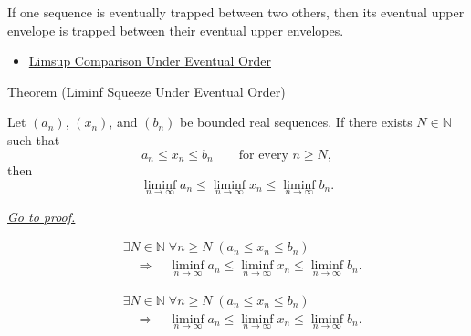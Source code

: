 \begin{remark*}[Interpretation]
If one sequence is eventually trapped between two others, then its eventual
upper envelope is trapped between their eventual upper envelopes.
\end{remark*}

\begin{dependencies}
\begin{itemize}
  \item \hyperref[thm:limsup-comparison-under-eventual-order]{Limsup Comparison Under Eventual Order}
\end{itemize}
\end{dependencies}


\begin{theorembox}{Theorem (Liminf Squeeze Under Eventual Order)}
\begin{theorem}
\label{thm:liminf-squeeze-under-eventual-order}
Let $(a_n)$, $(x_n)$, and $(b_n)$ be bounded real sequences. If there
exists $N\in\mathbb{N}$ such that
\[
  a_n\le x_n\le b_n
  \qquad\text{for every }n\ge N,
\]
then
\[
  \liminf_{n\to\infty}a_n
  \le
  \liminf_{n\to\infty}x_n
  \le
  \liminf_{n\to\infty}b_n.
\]

\smallskip
\noindent
\hyperref[prf:liminf-squeeze-under-eventual-order]{\textit{Go to proof.}}
\end{theorem}
\end{theorembox}

\begin{remark*}
\[
\begin{aligned}
&\exists N\in\mathbb{N}\;\forall n\ge N\;(a_n\le x_n\le b_n)\\
&\quad\Longrightarrow\quad
\liminf_{n\to\infty}a_n
\le
\liminf_{n\to\infty}x_n
\le
\liminf_{n\to\infty}b_n.
\end{aligned}
\]
\end{remark*}

\begin{remark*}
\[
\begin{aligned}
&\exists N\in\mathbb{N}\;\forall n\ge N\;(a_n\le x_n\le b_n)\\
&\quad\Longrightarrow\quad
\liminf_{n\to\infty}a_n
\le
\liminf_{n\to\infty}x_n
\le
\liminf_{n\to\infty}b_n.
\end{aligned}
\]
\end{remark*}

